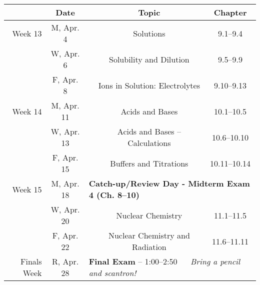 \documentclass[12pt, letterpaper]{article}
\begin{document}
\begin{tabular}{rcccc}
	& Date && Topic & Chapter\\
	\midrule
	Week 13 & M, Apr. 4&& Solutions & 9.1--9.4\\
	& W, Apr. 6&& Solubility and Dilution & 9.5--9.9\\
	& F, Apr. 8&& Ions in Solution: Electrolytes & 9.10--9.13\\
	\midrule
	Week 14 & M, Apr. 11&& Acids and Bases & 10.1--10.5\\
	& W, Apr. 13&& Acids and Bases -- Calculations & 10.6--10.10\\
	& F, Apr. 15&& Buffers and Titrations & 10.11--10.14\\
	\midrule
	Week 15 & M, Apr. 18& \multicolumn{3}{l}{\textbf{Catch-up/Review Day - Midterm Exam 4 (Ch. 8--10)}}\\
	& W, Apr. 20&& Nuclear Chemistry & 11.1--11.5\\
	& F, Apr. 22&& Nuclear Chemistry and Radiation & 11.6--11.11\\
	\midrule
	Finals Week& R, Apr. 28& \multicolumn{3}{l}{\textbf{Final Exam} -- 1:00--2:50 ~~ \emph{Bring a pencil and scantron!}}\\
\end{tabular}
\end{document}
